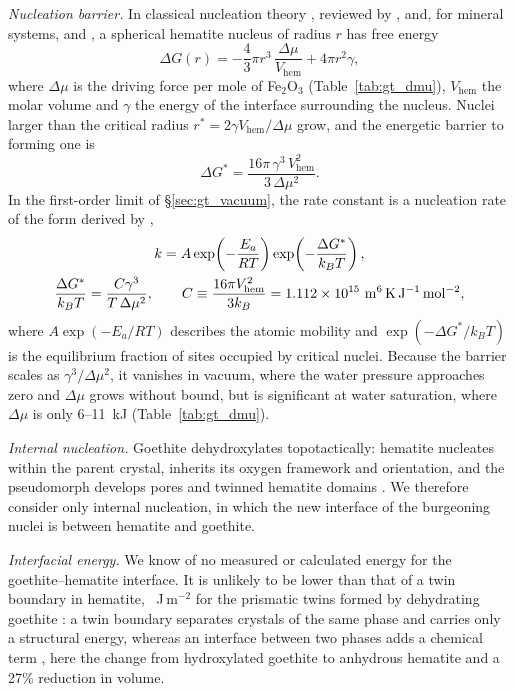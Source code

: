 \textit{Nucleation barrier.} In classical nucleation theory \citep{gibbs1878,volmer1926,becker1935},
reviewed by \citet{christian2002}, \citet{kashchiev2000} and, for mineral systems,
\citet{deyoreo2003} and \citet{lasaga1998}, a spherical hematite nucleus of radius $r$ has free
energy
\begin{equation}
  \Delta G(r) = -\frac{4}{3}\pi r^{3}\,\frac{\Delta\mu}{V_{\mathrm{hem}}} + 4\pi r^{2}\gamma,
\end{equation}
where $\Delta\mu$ is the driving force per mole of Fe$_2$O$_3$ (Table~\ref{tab:gt_dmu}),
$V_{\mathrm{hem}}$ the molar volume and $\gamma$ the energy of the interface surrounding the
nucleus. Nuclei larger than the critical radius $r^{*} = 2\gamma V_{\mathrm{hem}}/\Delta\mu$ grow,
and the energetic barrier to forming one is
\begin{equation}
  \Delta G^{*} = \frac{16\pi\,\gamma^{3}\,V_{\mathrm{hem}}^{2}}{3\,\Delta\mu^{2}} .
  \label{eq:gt_barrier}
\end{equation}
In the first-order limit of \S\ref{sec:gt_vacuum}, the rate constant is a nucleation rate of the
form derived by \citet{turnbull1949},
\begin{gather}
  k = A\exp\!\left(-\frac{E_a}{RT}\right)\exp\!\left(-\frac{\Delta G^{*}}{k_B T}\right), \notag\\
  \frac{\Delta G^{*}}{k_B T} = \frac{C\gamma^{3}}{T\,\Delta\mu^{2}},
  \qquad
  C \equiv \frac{16\pi V_{\mathrm{hem}}^{2}}{3k_B} = 1.112\times10^{15}~\mathrm{m^6\,K\,J^{-1}\,mol^{-2}} ,
  \label{eq:gt_knuc}
\end{gather}
where $A\exp(-E_a/RT)$ describes the atomic mobility and $\exp(-\Delta G^{*}/k_BT)$ is the
equilibrium fraction of sites occupied by critical nuclei. Because the barrier scales as
$\gamma^3/\Delta\mu^2$, it vanishes in vacuum, where the water pressure approaches zero and $\Delta\mu$
grows without bound, but is significant at water saturation, where $\Delta\mu$ is only 6--11~kJ
(Table~\ref{tab:gt_dmu}).

\textit{Internal nucleation.} Goethite dehydroxylates topotactically: hematite nucleates within
the parent crystal, inherits its oxygen framework and orientation, and the pseudomorph develops
pores and twinned hematite domains \citep{limadefaria1963,watari1979,watari1983,cudennec2005}.
We therefore consider only internal nucleation, in which the new interface of the burgeoning nuclei is between hematite
and goethite.

\textit{Interfacial energy.} We know of no measured or calculated energy for the goethite--hematite
interface. It is unlikely to be lower than that of a twin boundary in hematite,
\ChTwoKinGammaTwin~J\,m$^{-2}$ for the prismatic twins formed by dehydrating goethite
\citep{saito2016}: a twin boundary separates crystals of the same phase and carries only a
structural energy, whereas an interface between two phases adds a chemical term
\citep{porter2009}, here the change from hydroxylated goethite to anhydrous hematite and a 27\%
reduction in volume.

